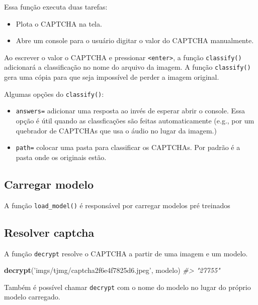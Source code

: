 \documentclass[12pt,]{report}
\newenvironment{Shaded}{\begin{snugshade}}{\end{snugshade}}
\newcommand{\KeywordTok}[1]{\textcolor[rgb]{0.13,0.29,0.53}{\textbf{#1}}}
\newcommand{\StringTok}[1]{\textcolor[rgb]{0.31,0.60,0.02}{#1}}
\newcommand{\CommentTok}[1]{\textcolor[rgb]{0.56,0.35,0.01}{\textit{#1}}}
\newcommand{\OperatorTok}[1]{\textcolor[rgb]{0.81,0.36,0.00}{\textbf{#1}}}
\newcommand{\NormalTok}[1]{#1}
\providecommand{\tightlist}{%
  \setlength{\itemsep}{0pt}\setlength{\parskip}{0pt}}
\begin{document}
Essa função executa duas tarefas:

\begin{itemize}
\tightlist
\item
  Plota o CAPTCHA na tela.
\item
  Abre um console para o usuário digitar o valor do CAPTCHA manualmente.
\end{itemize}

Ao escrever o valor o CAPTCHA e pressionar
\texttt{\textless{}enter\textgreater{}}, a função \texttt{classify()}
adicionará a classificação no nome do arquivo da imagem. A função
\texttt{classify()} gera uma cópia para que seja impossível de perder a
imagem original.

Algumas opções do \texttt{classify()}:

\begin{itemize}
\tightlist
\item
  \texttt{answers=} adicionar uma resposta ao invés de esperar abrir o
  console. Essa opção é útil quando as classficações são feitas
  automaticamente (e.g., por um quebrador de CAPTCHAs que usa o áudio no
  lugar da imagem.)
\item
  \texttt{path=} colocar uma pasta para classificar os CAPTCHAs. Por
  padrão é a pasta onde os originais estão.
\end{itemize}

\subsection{Carregar modelo}\label{carregar-modelo}

A função \texttt{load\_model()} é responsável por carregar modelos pré
treinados

\begin{Shaded}
\end{Shaded}

\subsection{Resolver captcha}\label{resolver-captcha}

A função \texttt{decrypt} resolve o CAPTCHA a partir de uma imagem e um
modelo.

\begin{Shaded}
\begin{Highlighting}[]
\KeywordTok{decrypt}\NormalTok{(}\StringTok{'imgs/tjmg/captcha2f6e4f7825d6.jpeg'}\NormalTok{, modelo)}
\CommentTok{#> "27755"}
\end{Highlighting}
\end{Shaded}

Também é possível chamar \texttt{decrypt} com o nome do modelo no lugar
do próprio modelo carregado.


\end{document}
